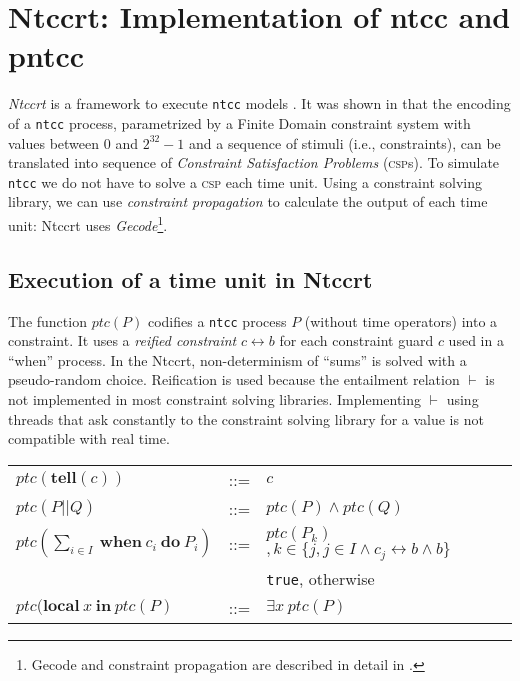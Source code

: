 \documentclass[english]{llncs}
\begin{document}
\section{Ntccrt: Implementation of ntcc and pntcc}
\textit{Ntccrt} is a framework to execute \texttt{ntcc} models \cite{toro08}.
It was shown in \cite{toro-report09} that the encoding of a 
\texttt{ntcc} process, parametrized by a Finite Domain constraint system with values between 0 and $2^{32}-1$ and a sequence of stimuli (i.e., constraints), can be translated into  sequence of \textit{Constraint Satisfaction Problems} (\textsc{csp}s). To simulate \texttt{ntcc} we do not have to solve a \textsc{csp} each time unit. Using a constraint solving library, we can use \textit{constraint propagation} to calculate the output of each time unit: Ntccrt uses  \textit{Gecode}\footnote{Gecode and constraint propagation are described in detail in \cite{tack09}.}.

\subsection{Execution of a time unit in Ntccrt}

The function $ptc(P)$ codifies a \texttt{ntcc} process $P$ (without time operators) into a constraint. It uses a \textit{reified constraint} $c \leftrightarrow b$ for each constraint guard $c$ used in a
``when'' process. In the Ntccrt, non-determinism of ``sums'' is solved with a pseudo-random choice. Reification is used because the entailment relation $\vdash$ is not implemented in most constraint solving libraries. Implementing $\vdash$ using threads that ask constantly to the constraint solving library for a value is not compatible with real time. 

\begin{center}\begin{tabular}{l l l }
$ptc(\textbf{tell}(c))$ &::= &$ c $\\

$ptc(P || Q)$ &::= &$ptc(P)\wedge ptc(Q)$\\


$ptc(\sum _{i \in I}\ \textbf{when}\ c_i \ \textbf{do}\ P_i)$ &::= &$ptc(P_k)$$, k \in \{ j, j \in I \wedge  c_j \leftrightarrow b \wedge b\}$ \\
&&\texttt{true}, otherwise \\

$ptc(\textbf{local}\ x\ \textbf{in}\ ptc(P)$ &::= &$\exists x\ ptc( P )$\\
\end{tabular}\end{center}
\end{document}
